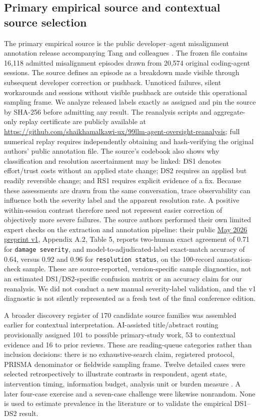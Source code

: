 \subsection{Primary empirical source and contextual source selection}
The primary empirical source is the public developer--agent misalignment annotation release accompanying Tang and colleagues \cite{ref35}. The frozen file contains 16,118 admitted misalignment episodes drawn from 20,574 original coding-agent sessions. The source defines an episode as a breakdown made visible through subsequent developer correction or pushback. Unnoticed failures, silent workarounds and sessions without visible pushback are outside this operational sampling frame. We analyze released labels exactly as assigned and pin the source by SHA-256 before admitting any result. The reanalysis scripts and aggregate-only replay certificate are publicly available at \url{https://github.com/shaikhamalkawi-ux/99llm-agent-oversight-reanalysis}; full numerical replay requires independently obtaining and hash-verifying the original authors' public annotation file. The source's codebook also shows why classification and resolution ascertainment may be linked: DS1 denotes effort/trust costs without an applied state change; DS2 requires an applied but readily reversible change; and RS1 requires explicit evidence of a fix. Because these assessments are drawn from the same conversation, trace observability can influence both the severity label and the apparent resolution rate. A positive within-session contrast therefore need not represent easier correction of objectively more severe failures. The source authors performed their own limited expert checks on the extraction and annotation pipeline: their public \href{https://arxiv.org/html/2605.29442v1}{May 2026 preprint v1}, Appendix A.2, Table 5, reports two-human exact agreement of 0.71 for \texttt{damage severity}, and model-to-adjudicated-label exact-match accuracy of 0.64, versus 0.92 and 0.96 for \texttt{resolution status}, on the 100-record annotation-check sample. These are source-reported, version-specific sample diagnostics, not an estimated DS1/DS2-specific confusion matrix or an accuracy claim for our reanalysis. We did not conduct a new manual severity-label validation, and the v1 diagnostic is not silently represented as a fresh test of the final conference edition.

A broader discovery register of 170 candidate source families was assembled earlier for contextual interpretation. AI-assisted title/abstract routing provisionally assigned 101 to possible primary-study work, 53 to contextual evidence and 16 to prior reviews. These are reading-queue categories rather than inclusion decisions: there is no exhaustive-search claim, registered protocol, PRISMA denominator or fieldwide sampling frame. Twelve detailed cases were selected retrospectively to illustrate contrasts in respondent, agent state, intervention timing, information budget, analysis unit or burden measure \cite{ref10,ref11,ref12,ref14,ref15,ref16,ref17,ref18,ref19,ref20,ref21,ref22}. A later four-case exercise and a seven-case challenge were likewise nonrandom. None is used to estimate prevalence in the literature or to validate the empirical DS1--DS2 result.

